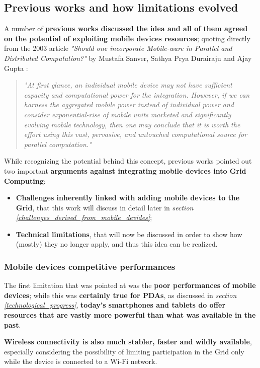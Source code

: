 \subsection{Previous works and how limitations evolved}
A number of \textbf{previous works discussed the idea and all of them agreed on the potential of exploiting mobile devices resources}; quoting directly from the 2003 article \textit{"Should one incorporate Mobile-ware in Parallel and Distributed Computation?"} by Mustafa Sanver, Sathya Prya Durairaju and Ajay Gupta \cite{should_one_incorporate_mobile_ware}:
\begin{quotation}
    \textit{"At first glance, an individual mobile device may not have sufficient capacity and computational power for the integration. However, if we can harness the aggregated mobile power instead of individual power and consider exponential-rise of mobile units marketed and significantly evolving mobile technology, then one may conclude that it is worth the effort using this vast, pervasive, and untouched computational source for parallel computation."}
\end{quotation}

While recognizing the potential behind this concept, previous works pointed out two important \textbf{arguments against integrating mobile devices into Grid Computing}:
\begin{itemize}
    \item \textbf{Challenges inherently linked with adding mobile devices to the Grid}, that this work will discuss in detail later in \textit{section \ref{challenges_derived_from_mobile_devides}};
    \item \textbf{Technical limitations}, that will now be discussed in order to show how (mostly) they no longer apply, and thus this idea can be realized.
\end{itemize}

\subsubsection{Mobile devices competitive performances}
The first limitation that was pointed at was the \textbf{poor performances of mobile devices}; while this was \textbf{certainly true for PDAs}, as discussed in \textit{section \ref{technological_progress}}, \textbf{today's smartphones and tablets do offer resources that are vastly more powerful than what was available in the past}.

\textbf{Wireless connectivity is also much stabler, faster and wildly available}, especially considering the possibility of limiting participation in the Grid only while the device is connected to a Wi-Fi network.

